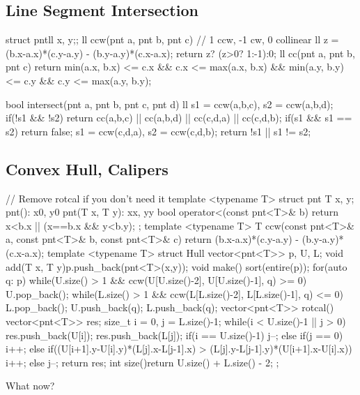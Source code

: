 \subsection{Line Segment Intersection}
\begin{cpp}
struct pnt{ll x, y;};
ll ccw(pnt a, pnt b, pnt c){
  // 1 ccw, -1 cw, 0 collinear
  ll z = (b.x-a.x)*(c.y-a.y) - (b.y-a.y)*(c.x-a.x);
  return z? (z>0? 1:-1):0;
}
ll cc(pnt a, pnt b, pnt c){
  return min(a.x, b.x) <= c.x && c.x <= max(a.x, b.x) &&
    min(a.y, b.y) <= c.y && c.y <= max(a.y, b.y);
}

bool intersect(pnt a, pnt b, pnt c, pnt d){
  ll s1 = ccw(a,b,c), s2 = ccw(a,b,d);
  if(!s1 && !s2)
    return cc(a,b,c) || cc(a,b,d) ||
           cc(c,d,a) || cc(c,d,b);
  if(s1 && s1 == s2) return false;
  s1 = ccw(c,d,a), s2 = ccw(c,d,b);
  return !s1 || s1 != s2;
}
\end{cpp}

\subsection{Convex Hull, Calipers}
\begin{cpp}
// Remove rotcal if you don't need it
template <typename T>
struct pnt{
  T x, y;
  pnt(): x{0}, y{0} {}
  pnt(T x, T y): x{x}, y{y} {}
  bool operator<(const pnt<T>& b)
    {return x<b.x || (x==b.x && y<b.y);}
};
template <typename T>
T ccw(const pnt<T>& a, const pnt<T>& b, const pnt<T>& c){
  return (b.x-a.x)*(c.y-a.y) - (b.y-a.y)*(c.x-a.x);
}
template <typename T>
struct Hull{
  vector<pnt<T>> p, U, L;
  void add(T x, T y){p.push_back(pnt<T>(x,y));}
  void make(){
    sort(entire(p));
    for(auto q: p){
      while(U.size() > 1 && ccw(U[U.size()-2],
        U[U.size()-1], q) >= 0) U.pop_back();
      while(L.size() > 1 && ccw(L[L.size()-2],
        L[L.size()-1], q) <= 0) L.pop_back();
      U.push_back(q); L.push_back(q);
    }
  }
  vector<pnt<T>> rotcal(){
    vector<pnt<T>> res;
    size_t i = 0, j = L.size()-1;
    while(i < U.size()-1 || j > 0){
      res.push_back(U[i]);
      res.push_back(L[j]);
      if(i == U.size()-1) j--;
      else if(j == 0) i++;
      else if((U[i+1].y-U[i].y)*(L[j].x-L[j-1].x) > 
        (L[j].y-L[j-1].y)*(U[i+1].x-U[i].x)) i++;
      else j--;
    }
    return res;
  }
  int size(){return U.size() + L.size() - 2;}
};
\end{cpp}

What now?
